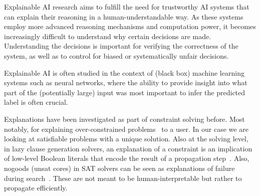 

Explainable AI research aims to fulfill the need for trustworthy AI systems that can explain their reasoning in a human-understandable way. 
As these systems employ more advanced reasoning mechanisms and computation power, it becomes increasingly difficult to understand why certain decisions are made. 
Understanding the decisions is important for verifying the correctness of the system, as well as to control for biased or systematically unfair decisions.

Explainable AI is often studied in the context of (black box) machine learning systems such as neural networks, where the ability to provide insight into what part of the (potentially large) input was most important to infer the predicted label is often crucial. 

Explanations have been investigated as part of constraint solving before. Most notably, for explaining over-constrained problems~\cite{junker2001quickxplain} to a user. In our case we are looking at satisfiable problems with a unique solution. Also at the solving level, in lazy clause generation solvers, an explanation of a constraint is an implication of low-level Boolean literals that encode the result of a propagation step~\cite{feydy2009lazy}. Also, nogoods (unsat cores) in SAT solvers can be seen as explanations of failure during search~\cite{marques2009conflict}. These are not meant to be human-interpretable but rather to propagate efficiently.


